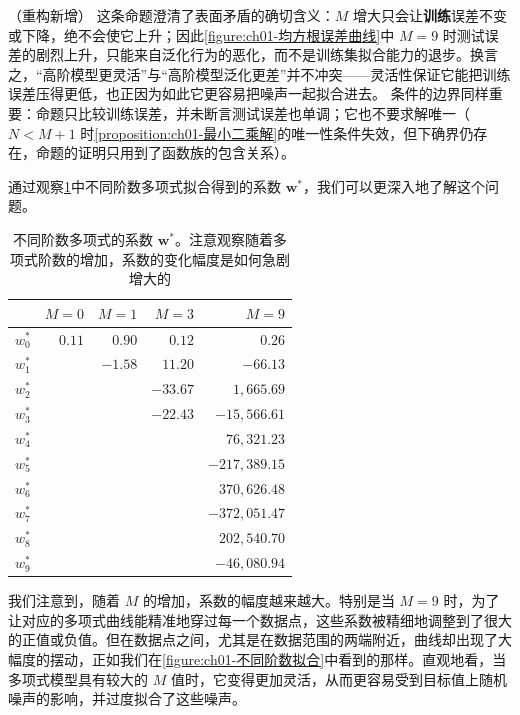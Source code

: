 \documentclass[../../main.tex]{subfiles}
\begin{document}
\begin{remark}（重构新增）
这条命题澄清了表面矛盾的确切含义：$M$ 增大只会让\textbf{训练}误差不变或下降，绝不会使它上升；因此\cref{figure:ch01-均方根误差曲线}中 $M=9$ 时测试误差的剧烈上升，只能来自泛化行为的恶化，而不是训练集拟合能力的退步。换言之，“高阶模型更灵活”与“高阶模型泛化更差”并不冲突——灵活性保证它能把训练误差压得更低，也正因为如此它更容易把噪声一起拟合进去。
条件的边界同样重要：命题只比较训练误差，并未断言测试误差也单调；它也不要求解唯一（$N<M+1$ 时\cref{proposition:ch01-最小二乘解}的唯一性条件失效，但下确界仍存在，命题的证明只用到了函数族的包含关系）。
\end{remark}

通过观察\cref{table:ch01-多项式系数}中不同阶数多项式拟合得到的系数 $\mathbf{w}^{*}$，我们可以更深入地了解这个问题。

\begin{table}[htbp]
  \centering
  \caption{不同阶数多项式的系数 $\mathbf{w}^{*}$。注意观察随着多项式阶数的增加，系数的变化幅度是如何急剧增大的}
  \label{table:ch01-多项式系数}
  \begin{tabular}{c *{4}{r}}
    \toprule
     & $M=0$ & $M=1$ & $M=3$ & $M=9$ \\
    \midrule
    $w_0^{*}$ & $0.11$ & $0.90$ & $0.12$ & $0.26$ \\
    $w_1^{*}$ &  & $-1.58$ & $11.20$ & $-66.13$ \\
    $w_2^{*}$ &  &  & $-33.67$ & $1{,}665.69$ \\
    $w_3^{*}$ &  &  & $-22.43$ & $-15{,}566.61$ \\
    $w_4^{*}$ &  &  &  & $76{,}321.23$ \\
    $w_5^{*}$ &  &  &  & $-217{,}389.15$ \\
    $w_6^{*}$ &  &  &  & $370{,}626.48$ \\
    $w_7^{*}$ &  &  &  & $-372{,}051.47$ \\
    $w_8^{*}$ &  &  &  & $202{,}540.70$ \\
    $w_9^{*}$ &  &  &  & $-46{,}080.94$ \\
    \bottomrule
  \end{tabular}
\end{table}

我们注意到，随着 $M$ 的增加，系数的幅度越来越大。特别是当 $M=9$ 时，为了让对应的多项式曲线能精准地穿过每一个数据点，这些系数被精细地调整到了很大的正值或负值。但在数据点之间，尤其是在数据范围的两端附近，曲线却出现了大幅度的摆动，正如我们在\cref{figure:ch01-不同阶数拟合}中看到的那样。直观地看，当多项式模型具有较大的 $M$ 值时，它变得更加灵活，从而更容易受到目标值上随机噪声的影响，并过度拟合了这些噪声。
\end{document}
